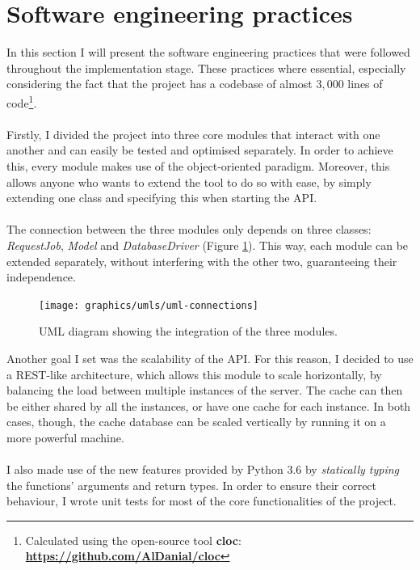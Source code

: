 	\section{Software engineering practices} \label{Section: impl/SoftEngPractices}
	In this section I will present the software engineering practices that were followed throughout the implementation stage. These practices where essential, especially considering the fact that the project has a codebase of almost $3,000$ lines of code\footnote{Calculated using the open-source tool \textbf{cloc}: \textbf{\url{https://github.com/AlDanial/cloc}}}. 
	\\ \\
	Firstly, I divided the project into three core modules that interact with one another and can easily be tested and optimised separately. In order to achieve this, every module makes use of the object-oriented paradigm. Moreover, this allows anyone who wants to extend the tool to do so with ease, by simply extending one class and specifying this when starting the API.  
	\\ \\
	The connection between the three modules only depends on three classes: \textit{RequestJob}, \textit{Model} and \textit{DatabaseDriver} (Figure \ref{Fig: impl/REST/API-integrate}). This way, each module can be extended separately, without interfering with the other two, guaranteeing their independence.  
	\begin{figure}[H]
		\centering
		\texttt{[image: graphics/umls/uml-connections]}
		\caption[General UML diagram]{\centering UML diagram showing the integration of the three modules.}
		\label{Fig: impl/REST/API-integrate}
	\end{figure}
	Another goal I set was the scalability of the API. For this reason, I decided to use a REST-like architecture, which allows this module to scale horizontally, by balancing the load between multiple instances of the server. The cache can then be either shared by all the instances, or have one cache for each instance. In both cases, though, the cache database can be scaled vertically by running it on a more powerful machine. 
	\\ \\
	I also made use of the new features provided by Python $3.6$ by \textit{statically typing} the functions' arguments and return types. In order to ensure their correct behaviour, I wrote unit tests for most of the core functionalities of the project.
